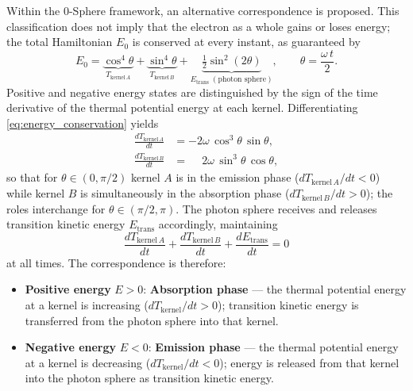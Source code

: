 \documentclass[12pt,letterpaper]{article}
\begin{document}
Within the 0-Sphere framework, an alternative correspondence is proposed. This classification does not imply that the electron as a whole gains or loses energy; the total Hamiltonian $E_0$ is conserved at every instant, as guaranteed by
\begin{equation}
  E_0 = \underbrace{\cos^4\!\theta}_{T_{\mathrm{kernel}\,A}} + \underbrace{\sin^4\!\theta}_{T_{\mathrm{kernel}\,B}} + \underbrace{\tfrac{1}{2}\sin^2\!(2\theta)}_{E_{\mathrm{trans}}\;(\text{photon sphere})}, \qquad \theta = \frac{\omega\, t}{2}.
  \label{eq:energy_conservation}
\end{equation}
Positive and negative energy states are distinguished by the sign of the time derivative of the thermal potential energy at each kernel. Differentiating \eqref{eq:energy_conservation} yields
\begin{align*}
  \frac{dT_{\mathrm{kernel}\,A}}{dt} &= -2\omega\,\cos^3\!\theta\,\sin\theta, \\
  \frac{dT_{\mathrm{kernel}\,B}}{dt} &= \phantom{-}2\omega\,\sin^3\!\theta\,\cos\theta,
\end{align*}
so that for $\theta\in(0,\pi/2)$ kernel $A$ is in the emission phase ($dT_{\mathrm{kernel}\,A}/dt < 0$) while kernel $B$ is simultaneously in the absorption phase ($dT_{\mathrm{kernel}\,B}/dt > 0$); the roles interchange for $\theta\in(\pi/2,\pi)$. The photon sphere receives and releases transition kinetic energy $E_{\mathrm{trans}}$ accordingly, maintaining
\[
  \frac{dT_{\mathrm{kernel}\,A}}{dt} + \frac{dT_{\mathrm{kernel}\,B}}{dt} + \frac{dE_{\mathrm{trans}}}{dt} = 0
\]
at all times. The correspondence is therefore:
\begin{itemize}
\item \textbf{Positive energy} $E > 0$: \textbf{Absorption phase} --- the thermal potential energy at a kernel is increasing ($dT_{\mathrm{kernel}}/dt > 0$); transition kinetic energy is transferred from the photon sphere into that kernel.
\item \textbf{Negative energy} $E < 0$: \textbf{Emission phase} --- the thermal potential energy at a kernel is decreasing ($dT_{\mathrm{kernel}}/dt < 0$); energy is released from that kernel into the photon sphere as transition kinetic energy.
\end{itemize}
\end{document}
